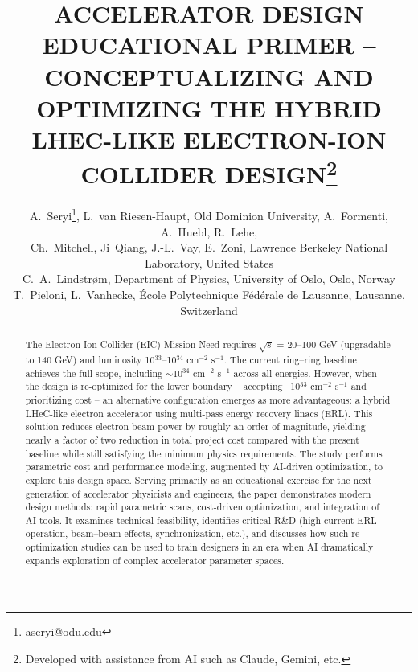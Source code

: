 \documentclass[%
               refpage,       %
               biblatex,     %
               hyphens,      %
               ]{jacow}
\begin{document}
\hypersetup{draft}



\title{ACCELERATOR DESIGN EDUCATIONAL PRIMER – CONCEPTUALIZING AND OPTIMIZING THE HYBRID LHEC-LIKE ELECTRON-ION COLLIDER DESIGN\thanks{Developed with assistance from AI such as Claude, Gemini, etc.}}

\author{A.~Seryi\thanks{aseryi@odu.edu}, L.~van Riesen-Haupt, Old Dominion University,  
A.~Formenti, A.~Huebl, R.~Lehe, \\
Ch.~Mitchell, Ji~Qiang, J.-L.~Vay, E.~Zoni, Lawrence Berkeley National Laboratory, United States\\ 
C.~A.~Lindstrøm, Department of Physics, University of Oslo, Oslo, Norway\\ 
T.~Pieloni, L.~Vanhecke, École Polytechnique Fédérale de Lausanne, Lausanne, Switzerland}

\maketitle


\begin{abstract}
The Electron-Ion Collider (EIC) Mission Need requires $\sqrt{s}$ = 20–100 GeV (upgradable to 140 GeV) and luminosity 10$^{33}$–10$^{34}$ cm$^{-2}$ s$^{-1}$. The current ring--ring baseline achieves the full scope, including $\sim$10$^{34}$ cm$^{-2}$ s$^{-1}$ across all energies. However, when the design is re-optimized for the lower boundary -- accepting ~10$^{33}$ cm$^{-2}$ s$^{-1}$ and prioritizing cost -- an alternative configuration emerges as more advantageous: a hybrid LHeC-like electron accelerator using multi-pass energy recovery linacs (ERL).
This solution reduces electron-beam power by roughly an order of magnitude, yielding nearly a factor of two reduction in total project cost compared with the present baseline while still satisfying the minimum physics requirements. The study performs parametric cost and performance modeling, augmented by AI-driven optimization, to explore this design space.
Serving primarily as an educational exercise for the next generation of accelerator physicists and engineers, the paper demonstrates modern design methods: rapid parametric scans, cost-driven optimization, and integration of AI tools. It examines technical feasibility, identifies critical R\&D (high-current ERL operation, beam--beam effects, synchronization, etc.), and discusses how such re-optimization studies can be used to train designers in an era when AI dramatically expands exploration of complex accelerator parameter spaces.
\end{abstract}
\end{document}
